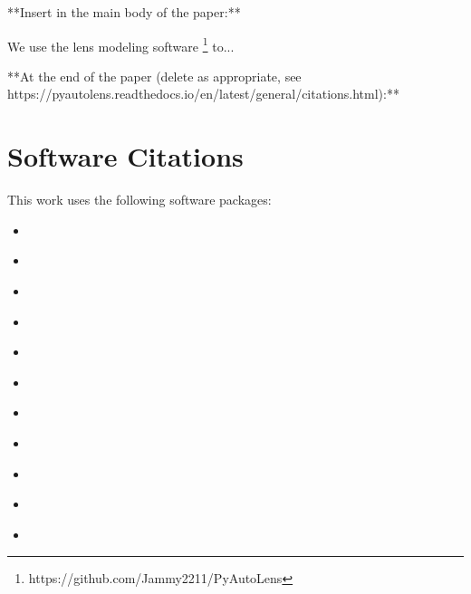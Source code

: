 **Insert in the main body of the paper:**

We use the lens modeling software  \footnote{https://github.com/Jammy2211/PyAutoLens} \citep{pyautolens, Nightingale2015, Nightingale2018} to...

**At the end of the paper (delete as appropriate, see https://pyautolens.readthedocs.io/en/latest/general/citations.html):**

\section*{Software Citations}

This work uses the following software packages:

\begin{itemize}

\item
\href{https://github.com/astropy/astropy}{}
\citep{astropy1, astropy2}

\item
\href{https://bitbucket.org/bdiemer/colossus/src/main/}{}
\citep{colossus}

\item
\href{https://github.com/dfm/corner.py}{}
\citep{corner}

\item
\href{https://github.com/joshspeagle/dynesty}{}
\citep{dynesty, dynesty1, dynesty2, dynesty3, dynesty4}

\item
\href{https://github.com/dfm/emcee}{}
\citep{emcee}

\item
\href{https://github.com/matplotlib/matplotlib}{}
\citep{matplotlib}

\item
\href{numba` https://github.com/numba/numba}{}
\citep{numba}

\item
\href{https://github.com/numpy/numpy}{}
\citep{numpy}

\item
\href{https://github.com/rhayes777/PyAutoFit}{}
\citep{pyautofit}

\item
\href{https://github.com/Jammy2211/PyAutoGalaxy}{}
\citep{Nightingale2018, pyautogalaxy}


\item
\href{https://github.com/GragasLab/nufftax}{}
\citep{nufftax, finufft}


\end{itemize}
